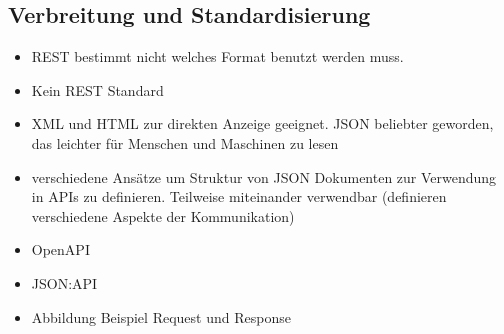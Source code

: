 \subsection{Verbreitung und Standardisierung}
\begin{itemize}
  \item REST bestimmt nicht welches Format benutzt werden muss.
  \item Kein REST Standard
  \item XML und HTML zur direkten Anzeige geeignet. JSON beliebter geworden, das leichter für Menschen und Maschinen zu lesen
  \item verschiedene Ansätze um Struktur von JSON Dokumenten zur Verwendung in APIs zu definieren. Teilweise miteinander verwendbar (definieren verschiedene Aspekte der Kommunikation)
  \item OpenAPI
  \item JSON:API
  \item Abbildung Beispiel Request und Response
\end{itemize}
